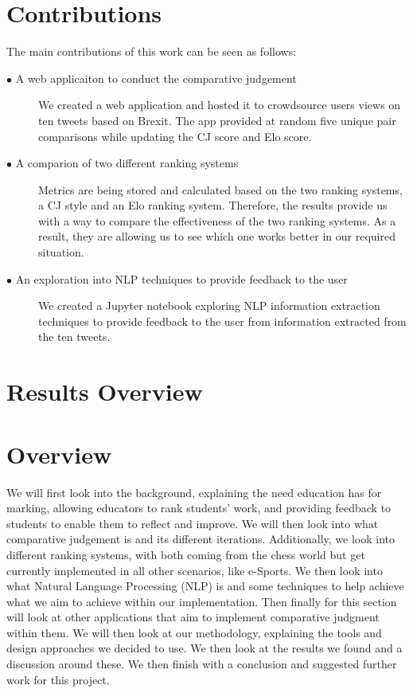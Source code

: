 	\section{Contributions} 
		\label{sec:intro_contribs} 

		The main contributions of this work can be seen as follows:

		\begin{description}	

			\item[\(\bullet\) A web applicaiton to conduct the comparative judgement]\hfill

			We created a web application and hosted it to crowdsource users views on ten tweets based on Brexit. The app provided at random five unique pair comparisons while updating the CJ score and Elo score. 

			\item[\(\bullet\) A comparion of two different ranking systems]\hfill

			Metrics are being stored and calculated based on the two ranking systems, a CJ style and an Elo ranking system. Therefore, the results provide us with a way to compare the effectiveness of the two ranking systems. As a result, they are allowing us to see which one works better in our required situation.

			\item[\(\bullet\) An exploration into NLP techniques to provide feedback to the user]\hfill

		We created a Jupyter notebook exploring NLP information extraction techniques to provide feedback to the user from information extracted from the ten tweets.

		\end{description}
	
	\section{Results Overview}
	
	\section{Overview}  
	\label{sec:intro_overview} 
	 We will first look into the background, explaining the need education has for marking, allowing educators to rank students' work, and providing feedback to students to enable them to reflect and improve. We will then look into what comparative judgement is and its different iterations. Additionally, we look into different ranking systems, with both coming from the chess world but get currently implemented in all other scenarios, like e-Sports. We then look into what Natural Language Processing (NLP) is and some techniques to help achieve what we aim to achieve within our implementation. Then finally for this section will look at other applications that aim to implement comparative judgment within them. We will then look at our methodology, explaining the tools and design approaches we decided to use. We then look at the results we found and a discussion around these. We then finish with a conclusion and suggested further work for this project.